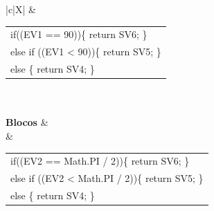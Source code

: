 \begin{xltabular}{\textwidth}{|c|X|}
{	} &  \begin{tabular}[c]{@{}l@{}}if((EV1 == 90))\{   return SV6; \}\\ else if ((EV1 < 90))\{   return SV5; \}\\ else \{   return SV4; \} \end{tabular}  \\ \hline
	 \\ \hline
	\textbf{Blocos} &  \\ \hline
	 & \begin{tabular}[c]{@{}l@{}}if((EV2 == Math.PI / 2))\{   return SV6; \}\\ else if ((EV2 < Math.PI / 2))\{   return SV5; \}\\ else \{   return SV4; \} \end{tabular}  \\ \hline


\end{xltabular}
